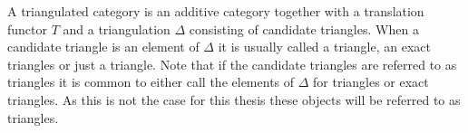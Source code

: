 \documentclass[12pt]{article}
\theoremstyle{definition}
\theoremstyle{remark}
\begin{document}
            \begin{center}
            \end{center}

            A triangulated category is an additive category together with a translation functor $T$ and a triangulation $\Delta$ consisting of candidate triangles. When a candidate triangle is an element of $\Delta$ it is usually called a  triangle, an exact triangles or just a triangle. Note that if the candidate triangles are referred to as triangles it is common to either call the elements of $\Delta$ for  triangles or exact triangles. As this is not the case for this thesis these objects will be referred to as triangles.
\end{document}
